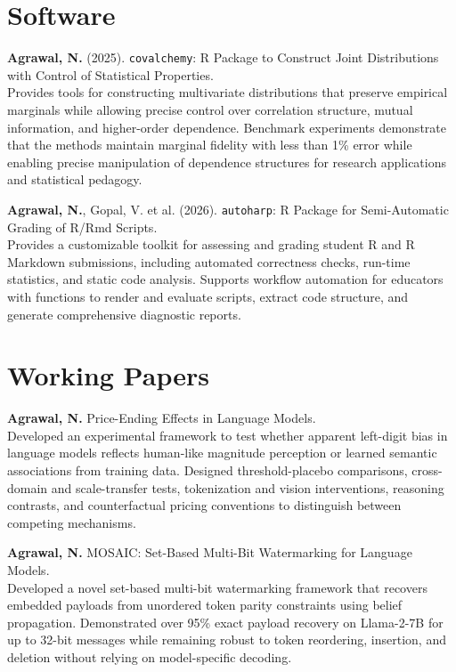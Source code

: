 \documentclass[10pt,a4paper]{article}
\begin{document}
\section{Software}

\textbf{Agrawal, N.} (2025). \texttt{covalchemy}: R Package to Construct Joint Distributions with Control of Statistical Properties.\\
{\small Provides tools for constructing multivariate distributions that preserve empirical marginals while allowing precise control over correlation structure, mutual information, and higher-order dependence. Benchmark experiments demonstrate that the methods maintain marginal fidelity with less than 1\% error while enabling precise manipulation of dependence structures for research applications and statistical pedagogy.}

\vspace{5pt}

\textbf{Agrawal, N.}, Gopal, V. et al. (2026). \texttt{autoharp}: R Package for Semi-Automatic Grading of R/Rmd Scripts.\\
{\small Provides a customizable toolkit for assessing and grading student R and R Markdown submissions, including automated correctness checks, run-time statistics, and static code analysis. Supports workflow automation for educators with functions to render and evaluate scripts, extract code structure, and generate comprehensive diagnostic reports.}

\section{Working Papers}

\textbf{Agrawal, N.} Price-Ending Effects in Language Models.\\
{\small Developed an experimental framework to test whether apparent left-digit bias in language models reflects human-like magnitude perception or learned semantic associations from training data. Designed threshold-placebo comparisons, cross-domain and scale-transfer tests, tokenization and vision interventions, reasoning contrasts, and counterfactual pricing conventions to distinguish between competing mechanisms.}


\vspace{5pt}

\textbf{Agrawal, N.} MOSAIC: Set-Based Multi-Bit Watermarking for Language Models.\\
{\small  Developed a novel set-based multi-bit watermarking framework that recovers embedded payloads from unordered token parity constraints using belief propagation. Demonstrated over 95\% exact payload recovery on Llama-2-7B for up to 32-bit messages while remaining robust to token reordering, insertion, and deletion without relying on model-specific decoding.}
\end{document}

